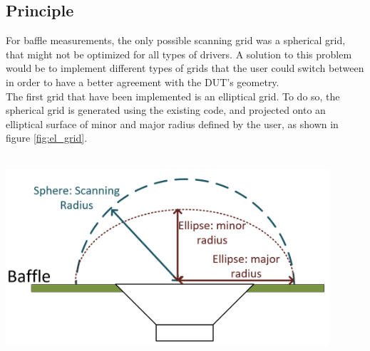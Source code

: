 \documentclass{report}
\begin{document}
\subsection{Principle}
\begin{minipage}{0.6\textwidth}
For baffle measurements, the only possible scanning grid was a spherical grid, that might not be optimized for all types of drivers. A solution to this problem would be to implement different types of grids that the user could switch between in order to have a better agreement with the DUT's geometry. \\
The first grid that have been implemented is an elliptical grid. To do so, the spherical grid is generated using the existing code, and projected onto an elliptical surface of minor and major radius defined by the user, as shown in figure \ref{fig:el_grid}. \\~\\
\end{minipage}
\begin{minipage}{0.4\textwidth}
\begin{center}
	\includegraphics[width=0.9\textwidth]{GridOpti/El_Grid_Draw} 
    \captionsetup{hypcap=false} 
	\label{fig:el_grid}
\end{center}
\end{minipage}

\vspace{0.5cm}
\end{document}
